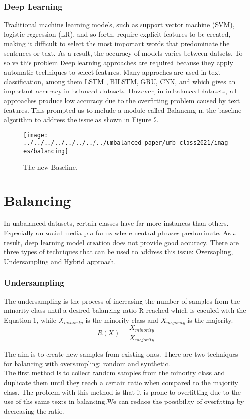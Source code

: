 \documentclass[conference]{IEEEtran}
\begin{document}
	\subsubsection{Deep Learning}	
Traditional machine learning models, such as support vector machine (SVM), logistic regression (LR), and so forth, require explicit features to be created, making it difficult to select the most important words that predominate the sentences or text. As a result, the accuracy of models varies between datsets. To solve this problem Deep learning approaches are required  because they apply automatic techniques to select features. Many approches are used in text classification, among them LSTM , BILSTM, GRU, CNN, and which gives an important accuracy in balanced datasets. However, in imbalanced datasets, all approaches produce low accuracy due to the overfitting problem caused by text features. This prompted us to include a module called Balancing in the baseline algorithm to address the issue as shown in Figure 2. 


\begin{figure}[htbp]
	\centerline{\texttt{[image: ../../../../../../../../umbalanced\_paper/umb\_class2021/images/balancing]}}
	\caption{The new Baseline.}
	\label{fig}
\end{figure}

	\section{Balancing}
	In unbalanced datasets, certain classes have far more instances than others. Especially on social media platforms where neutral phrases predominate. As a result, deep learning model creation does not provide good accuracy.  There are three types of techniques that can be used to address this issue: Oversapling, Undersampling and Hybrid approach.\\
	\subsubsection{Undersampling}
	The undersampling is the process of increasing the number of samples from the minority class until a desired balancing ratio R reached which is  caculed with the Equation 1, while $X_{minority}$ is the minority class and $X_{majority}$ is the majority.
	\begin{equation}
	R(X)= \frac{X_{minority}}{X_{majority}}
	\end{equation}
	
	The aim is to create new samples from existing ones. There are two techniques for balancing with oversampling: random and synthetic.\\
	The first method is to collect random samples from the minority class and duplicate them until they reach a certain ratio when compared to the majority class. The problem with this method is that it is prone to overfitting due to the use of the same texts in balancing.We can reduce the possibility of overfitting by decreasing the ratio. \\
	
\end{document}
